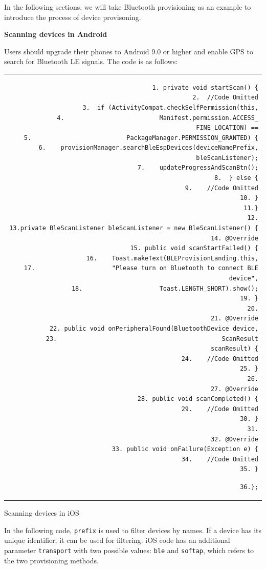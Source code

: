 \documentclass[a4paper,12pt,openany]{book}
\renewcommand{\ttfamily}{\fontfamily{pcr}\selectfont}
\renewcommand{\arraystretch}{1}
\newenvironment{codebloc}{ %
    \ttfamily\footnotesize
    \renewcommand{\arraystretch}{1}
}
\newcommand{\note}[2][NOTE]{ %
\vspace{6pt}
\begin{tabular}{b{\textwidth}}
\hline
\fontfamily{phv}\selectfont \textbf{#1}\\
\leftskip 1em #2\\
\hline
\end{tabular}
}
\begin{document}
In the following sections, we will take Bluetooth provisioning as an example to introduce the process of device provisoning.

\textbf{Scanning devices in Android}

Users should upgrade their phones to Android 9.0 or higher and enable GPS to search for Bluetooth LE signals. The code is as follows:


\vspace{6pt}
\begin{codebloc}
\begin{tabular}{d}
\vspace{2pt}
\begin{verbatim}
1. private void startScan() {
2.  //Code Omitted
3.  if (ActivityCompat.checkSelfPermission(this,
4.                          Manifest.permission.ACCESS_ FINE_LOCATION) ==
5.                          PackageManager.PERMISSION_GRANTED) {
6.    provisionManager.searchBleEspDevices(deviceNamePrefix, bleScanListener);
7.    updateProgressAndScanBtn();
8.  } else {
9.    //Code Omitted
10. }
11.}
12.
13.private BleScanListener bleScanListener = new BleScanListener() {
14. @Override
15. public void scanStartFailed() {
16.    Toast.makeText(BLEProvisionLanding.this,
17.                     "Please turn on Bluetooth to connect BLE device",
18.                     Toast.LENGTH_SHORT).show();
19. }
20.
21. @Override
22. public void onPeripheralFound(BluetoothDevice device,
23.                                             ScanResult scanResult) {
24.    //Code Omitted
25. }
26.
27. @Override
28. public void scanCompleted() {
29.    //Code Omitted
30. }
31.
32. @Override
33. public void onFailure(Exception e) {
34.    //Code Omitted
35. }
\end{verbatim}
\verb|36.};|
\end{tabular}
\end{codebloc}

\textbf{Scanning devices in iOS}

In the following code, \verb|prefix| is used to filter devices by names. If a device has its unique identifier, it can be used for filtering. iOS code has an additional parameter \verb|transport| with two possible values: \verb|ble| and \verb|softap|, which refers to the two provisioning methods.
\end{document}
